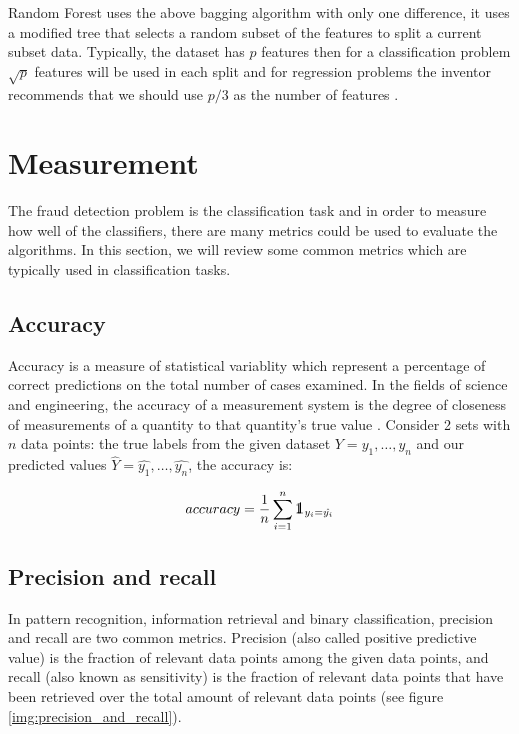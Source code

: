 Random Forest uses the above bagging algorithm with only one difference, it uses a modified tree that selects a random subset of the features to split a current subset data. Typically, the dataset has $p$ features then for a classification problem $\sqrt{p}$ features will be used in each split and for regression problems the inventor recommends that we should use $p/3$ as the number of features \citep{friedman2001elements}.


\section{Measurement}
\label{measurement_premilinaries}

The fraud detection problem is the classification task and in order to measure how well of the classifiers, there are many metrics could be used to evaluate the algorithms. In this section, we will review some common metrics which are typically used in classification tasks.


\subsection*{Accuracy}

Accuracy is a measure of statistical variablity which represent a percentage of correct predictions on the total number of cases examined. In the fields of science and engineering, the accuracy of a measurement system is the degree of closeness of measurements of a quantity to that quantity's true value \citep{bipm2008international}. Consider 2 sets with $n$ data points: the true labels from the given dataset $Y = {y_1, \dots, y_n}$ and our predicted values $\hat{Y} = {\hat{y_1}, \dots, \hat{y_n}}$, the accuracy is:

\begin{equation}
accuracy = \dfrac{ 1 }{ n } \sum_{i = 1}^n \mbox{1\hspace{-4.25pt}\fontsize{12}{14.4}\selectfont\textrm{1}}_{ y_i = \hat{y_i} }
\end{equation}


\subsection*{Precision and recall}

In pattern recognition, information retrieval and binary classification, precision and recall are two common metrics. Precision (also called positive predictive value) is the fraction of relevant data points among the given data points, and recall (also known as sensitivity) is the fraction of relevant data points that have been retrieved over the total amount of relevant data points (see figure \ref{img:precision_and_recall}).


